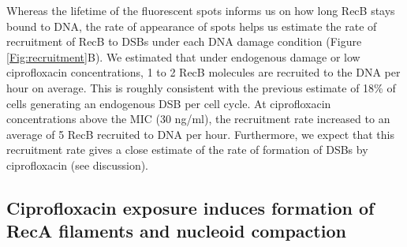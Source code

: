 Whereas the lifetime of the fluorescent spots informs us on how long RecB stays bound to DNA, the rate of appearance of spots helps us estimate the rate of recruitment of RecB to DSBs under each DNA damage condition (Figure \ref{Fig:recruitment}B). We estimated that under endogenous damage or low ciprofloxacin concentrations, 1 to 2 RecB molecules are recruited to the DNA per hour on average. This is roughly consistent with the previous estimate of 18\% of cells generating an endogenous DSB per cell cycle\cite{Sinha2018}. At ciprofloxacin concentrations above the MIC (30 ng/ml), the recruitment rate increased to an average of 5 RecB recruited to DNA per hour. Furthermore, we expect that this recruitment rate gives a close estimate of the rate of formation of DSBs by ciprofloxacin (see discussion).





\subsection*{Ciprofloxacin exposure induces formation of RecA filaments and nucleoid compaction}


